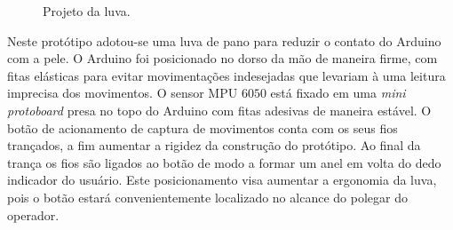 \begin{figure}[ht]
    \centering
    \caption{Projeto da luva.}
        \hspace{0.5cm}
    \label{fig:luva}
\end{figure}

Neste protótipo adotou-se uma luva de pano para reduzir o contato do Arduino com a pele.
O Arduino foi posicionado no dorso da mão de maneira firme, com fitas elásticas para evitar movimentações indesejadas que levariam à uma leitura imprecisa dos movimentos.
% 
O sensor MPU $6050$ está fixado em uma \textit{mini protoboard} presa no topo do Arduino com fitas adesivas de maneira estável. O botão de acionamento de captura de movimentos conta com os seus fios trançados, a fim aumentar a rigidez da construção do protótipo. Ao final da trança os fios são ligados ao botão de modo a formar um anel em volta do dedo indicador do usuário. Este posicionamento visa aumentar a ergonomia da luva, pois o botão estará convenientemente localizado no alcance do polegar do operador.

